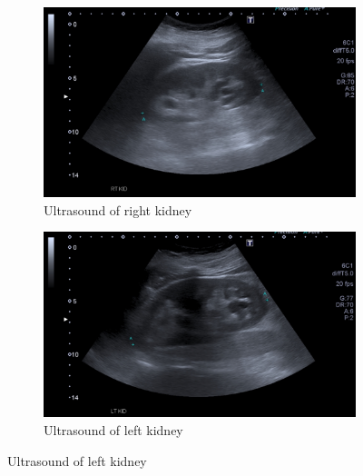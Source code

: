\documentclass[11pt, ]{article}
\begin{document}
\begin{figure}
\begin{subfigure}{.5\textwidth}
\includegraphics[width=\textwidth]{rtkidus}
\caption{Ultrasound of right kidney}
\end{subfigure}
\begin{subfigure}{.5\textwidth}
\includegraphics[width=\textwidth]{ltkidus}
\caption{Ultrasound of left kidney}
\end{subfigure}
\end{figure}
\end{document}
